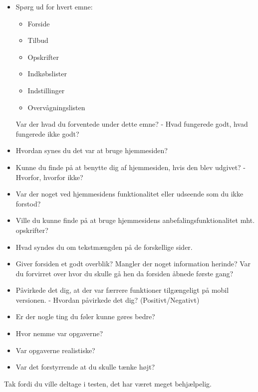 \begin{itemize}
	\item Spørg ud for hvert emne:
	\begin{itemize}
		\item Forside
		\item Tilbud
		\item Opskrifter
		\item Indkøbslister
		\item Indstillinger
		\item Overvågningslisten
	\end{itemize}
	Var der hvad du forventede under dette emne? - Hvad fungerede godt, hvad fungerede ikke godt?
	\item Hvordan synes du det var at bruge hjemmesiden?
	\item Kunne du finde på at benytte dig af hjemmesiden, hvis den blev udgivet? - Hvorfor, hvorfor ikke?
	\item Var der noget ved hjemmesidens funktionalitet eller udseende som du ikke forstod?
	\item Ville du kunne finde på at bruge hjemmesidens anbefalingsfunktionalitet mht. opskrifter?
	\item Hvad syndes du om tekstmængden på de forskellige sider.
	
	\item Giver forsiden et godt overblik? Mangler der noget information herinde? Var du forvirret over hvor du skulle gå hen da forsiden åbnede første gang?
	\item Påvirkede det dig, at der var færrere funktioner tilgængeligt på mobil versionen. - Hvordan påvirkede det dig? (Positivt/Negativt)
	\item Er der nogle ting du føler kunne gøres bedre?
	\item Hvor nemme var opgaverne?
	\item Var opgaverne realistiske?
	\item Var det forstyrrende at du skulle tænke højt?
\end{itemize}	

Tak fordi du ville deltage i testen, det har været meget behjælpelig.
